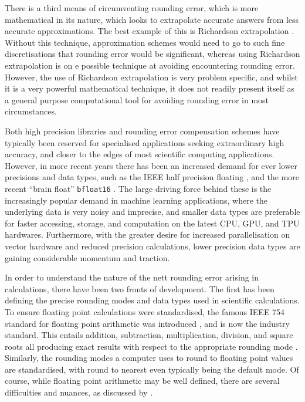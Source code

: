 \documentclass[manuscript,review]{acmart}
\begin{document}
There is a third means of circumventing rounding error, which is more mathematical in its nature, which looks to extrapolate accurate answers from less accurate approximations. The best example of this is Richardson extrapolation \citep{richardson1927viii,marchuk2012difference}. Without this technique, approximation schemes would need to go to such fine discretisations that rounding error would be significant, whereas using Richardson extrapolation is on e possible technique at avoiding encountering rounding error. However, the use of Richardson extrapolation is very problem specific, and whilst it is a very powerful mathematical technique, it does not readily present itself as a general purpose computational tool for avoiding rounding error in most circumstances.  

Both high precision libraries and rounding error compensation schemes have typically been reserved for specialised applications seeking extraordinary high accuracy, and closer to the edges of most scientific computing applications. However, in more recent years there has been an increased demand for ever lower precisions and data types, such as the IEEE half precision floating \citep[\texttt{FP16/binary16}]{ieee2008ieee}, and the more recent ``brain float'' \texttt{bfloat16} \citep{burgess2019bfloat16,kalamkar2019study}. The large driving force behind these is the increasingly popular demand in machine learning applications, where the underlying data is very noisy and imprecise, and smaller data types are preferable for faster accessing, storage, and computation on the latest CPU, GPU, and TPU hardwares. Furthermore, with the greater desire for increased parallelisation on vector hardware and reduced precision calculations, lower precision data types are gaining considerable momentum and traction. 

In order to understand the nature of the nett rounding error arising in calculations, there have been two fronts of development. The first has been defining the precise rounding modes and data types used in scientific calculations. To ensure floating point calculations were standardised, the famous IEEE 754 standard for floating point arithmetic was introduced \citep{ieee1985ieee}, and is now the industry standard. This entails addition, subtraction, multiplication, division, and square roots all producing exact results with respect to the appropriate rounding mode \citep[page~15]{tucker2011validated}. Similarly, the rounding modes a computer uses to round to floating point values are standardised, with round to nearest even typically being the default mode. Of course, while floating point arithmetic may be well defined, there are several difficulties and nuances, as discussed by \citet{goldberg1991every}.
\end{document}
